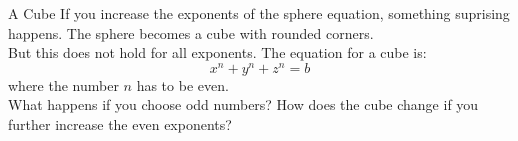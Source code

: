 \begin{surferPage}[Cube]{A Cube}
If you increase the exponents of the sphere equation, something suprising happens. The sphere becomes a cube with rounded corners.\\
\vspace{0.3cm}
But this does not hold for all exponents. The equation for a cube is:
\[x^n+y^n+z^n=b\]
where the number $n$ has to be even.\\
\vspace{0.3cm}
What happens if you choose odd numbers? How does the cube change if you further increase the even exponents?
\end{surferPage}
